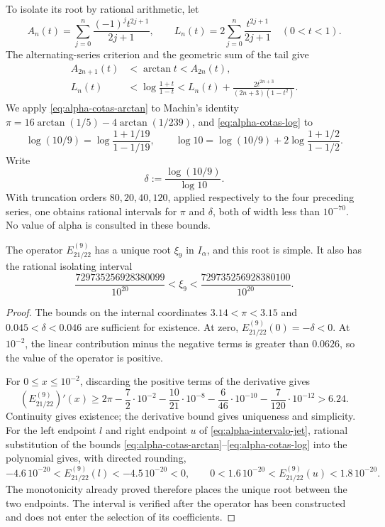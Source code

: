 To isolate its root by rational arithmetic, let
\[
 A_n(t)=\sum_{j=0}^{n}\frac{(-1)^jt^{2j+1}}{2j+1},\qquad
 L_n(t)=2\sum_{j=0}^{n}\frac{t^{2j+1}}{2j+1}\quad(0<t<1).
\]
The alternating-series criterion and the geometric sum of the tail give
\begin{align}
 A_{2n+1}(t)&<\arctan t<A_{2n}(t),
 \label{eq:alpha-cotas-arctan}\\
 L_n(t)&<\log\frac{1+t}{1-t}
 <L_n(t)+\frac{2t^{2n+3}}{(2n+3)(1-t^2)}.
 \label{eq:alpha-cotas-log}
\end{align}
We apply \eqref{eq:alpha-cotas-arctan} to Machin's identity
\(\pi=16\arctan(1/5)-4\arctan(1/239)\), and
\eqref{eq:alpha-cotas-log} to
\[
 \log(10/9)=\log\frac{1+1/19}{1-1/19},\qquad
 \log 10=\log(10/9)+2\log\frac{1+1/2}{1-1/2}.
\]
Write
\[
 \delta:=\frac{\log(10/9)}{\log 10}.
\]
With truncation orders \(80,20,40,120\), applied respectively to the four
preceding series, one obtains rational intervals for \(\pi\) and \(\delta\),
both of width less than \(10^{-70}\). No value of alpha is consulted in these
bounds.

\begin{proposition}
\label{prop:alpha-raiz-jet}
The operator \(E_{21/22}^{(9)}\) has a unique root \(\xi_9\) in
\(I_\alpha\), and this root is simple. It also has the rational isolating
interval
\begin{equation}
 \frac{729735256928380099}{10^{20}}
 <\xi_9<\frac{729735256928380100}{10^{20}}.
 \label{eq:alpha-intervalo-jet}
\end{equation}
\end{proposition}

\begin{proof}
The bounds on the internal coordinates \(3.14<\pi<3.15\) and
\(0.045<\delta<0.046\) are sufficient for existence. At zero,
\(E_{21/22}^{(9)}(0)=-\delta<0\). At \(10^{-2}\), the linear contribution
minus the negative terms is greater than \(0.0626\), so the value of the
operator is positive.

For \(0\leq x\leq10^{-2}\), discarding the positive terms of the derivative
gives
\[
 (E_{21/22}^{(9)})'(x)
 \geq2\pi-\frac72\cdot10^{-2}
 -\frac{10}{21}\cdot10^{-8}-\frac6{46}\cdot10^{-10}
 -\frac7{120}\cdot10^{-12}>6.24.
\]
Continuity gives existence; the derivative bound gives uniqueness and
simplicity. For the left endpoint \(l\) and right endpoint \(u\) of
\eqref{eq:alpha-intervalo-jet}, rational substitution of the bounds
\eqref{eq:alpha-cotas-arctan}--\eqref{eq:alpha-cotas-log} into the polynomial
gives, with directed rounding,
\[
 -4.6\,10^{-20}<E_{21/22}^{(9)}(l)<-4.5\,10^{-20}<0,
 \qquad
 0<1.6\,10^{-20}<E_{21/22}^{(9)}(u)<1.8\,10^{-20}.
\]
The monotonicity already proved therefore places the unique root between the
two endpoints. The interval is verified after the operator has been
constructed and does not enter the selection of its coefficients.
\end{proof}

